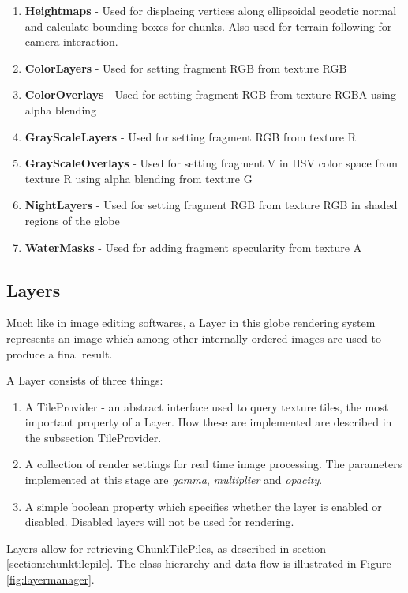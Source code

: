 \begin{enumerate}
\item \textbf{Heightmaps} - Used for displacing vertices along ellipsoidal geodetic normal and calculate bounding boxes for chunks. Also used for terrain following for camera interaction.
\item \textbf{ColorLayers} - Used for setting fragment RGB from texture RGB
\item \textbf{ColorOverlays} - Used for setting fragment RGB from texture RGBA using alpha blending
\item \textbf{GrayScaleLayers} - Used for setting fragment RGB from texture R
\item \textbf{GrayScaleOverlays} - Used for setting fragment V in HSV color space from texture R using alpha blending from texture G
\item \textbf{NightLayers} - Used for setting fragment RGB from texture RGB in shaded regions of the globe
\item \textbf{WaterMasks} - Used for adding fragment specularity from texture A
\end{enumerate}

\subsection{Layers}

Much like in image editing softwares, a Layer in this globe rendering system represents an image which among other internally ordered images are used to produce a final result.

A Layer consists of three things:

\begin{enumerate}
\item A TileProvider - an abstract interface used to query texture tiles, the most important property of a Layer. How these are implemented are described in the subsection TileProvider.
\item A collection of render settings for real time image processing. The parameters implemented at this stage are \emph{gamma}, \emph{multiplier} and \emph{opacity}.
\item A simple boolean property which specifies whether the layer is enabled or disabled. Disabled layers will not be used for rendering.
\end{enumerate}

Layers allow for retrieving ChunkTilePiles, as described in section \ref{section:chunktilepile}. The class hierarchy and data flow is illustrated in Figure \ref{fig:layermanager}.

